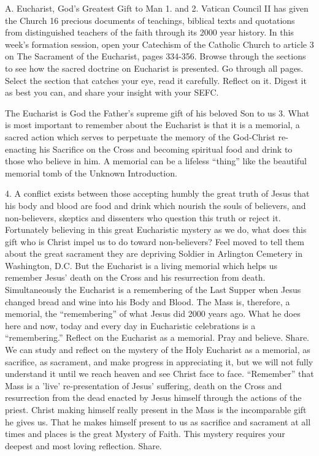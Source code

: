 \documentclass[oneside]{book}
\begin{document}
A. Eucharist, God's Greatest Gift to Man
1. and 2. Vatican Council II has given the Church 16 precious documents of
teachings, biblical texts and quotations from distinguished teachers of the
faith through its 2000 year history. In this week's formation session, open your
Catechism of the Catholic Church to article 3 on The Sacrament of the Eucharist,
pages 334-356. Browse through the sections to see how the sacred doctrine on
Eucharist is presented. Go through all pages. Select the section that catches
your eye, read it carefully. Reflect on it. Digest it as best you can, and share
your insight with your SEFC.

The Eucharist is God the Father's supreme gift of his beloved Son to us
3. What is most important to remember about the Eucharist is that it is a
memorial, a sacred action which serves to perpetuate the memory of the
God-Christ re-enacting his Sacrifice on the Cross and becoming spiritual food
and drink to those who believe in him. A memorial can be a lifeless ``thing''
like the beautiful memorial tomb of the Unknown Introduction.

4. A conflict exists between those accepting humbly the great truth of Jesus
that his body and blood are food and drink which nourish the souls of believers,
and non-believers, skeptics and dissenters who question this truth or reject
it. Fortunately believing in this great Eucharistic mystery as we do, what does
this gift who is Christ impel us to do toward non-believers? Feel moved to tell
them about the great sacrament they are depriving Soldier in Arlington Cemetery
in Washington, D.C. But the Eucharist is a living memorial which helps us
remember Jesus' death on the Cross and his resurrection from
death. Simultaneously the Eucharist is a remembering of the Last Supper when
Jesus changed bread and wine into his Body and Blood. The Mass is, therefore, a
memorial, the ``remembering'' of what Jesus did 2000 years ago. What he does
here and now, today and every day in Eucharistic celebrations is a
``remembering.'' Reflect on the Eucharist as a memorial. Pray and
believe. Share.
We can study and reflect on the mystery of the Holy Eucharist as a memorial, as
sacrifice, as sacrament, and make progress in appreciating it, but we will not
fully understand it until we reach heaven and see Christ face to
face. ``Remember'' that Mass is a 'live' re-presentation of Jesus' suffering,
death on the Cross and resurrection from the dead enacted by Jesus himself
through the actions of the priest. Christ making himself really present in the
Mass is the incomparable gift he gives us. That he makes himself present to us
as sacrifice and sacrament at all times and places is the great Mystery of
Faith. This mystery requires your deepest and most loving reflection. Share.
\end{document}
